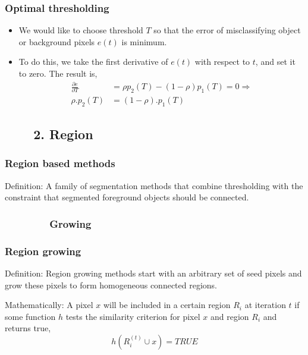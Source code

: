 \begin{frame}
\frametitle{Optimal thresholding}
\logoCSIPCPL\mypagenum
	\begin{itemize}
		\item We would like to choose threshold $T$ so that the error of
		misclassifying object or background pixels $e(t)$ is minimum.
		\item To do this, we take the first derivative of $e(t)$ with respect
		to $t$, and set it to zero.  The result is,
		\begin{align*}
			\frac{\partial{e}}{\partial{T}}&=\rho p_2(T) - (1-\rho) p_1(T) = 0 \Rightarrow \\
			\rho.p_2(T)  &= (1-\rho).p_1(T)
		\end{align*}	
	\end{itemize}
\end{frame}





\subsection{\ \ \ \ 2. Region}

\begin{frame}
\frametitle{Region based methods}
\logoCSIPCPL\mypagenum
	\begin{block}{Definition:}
		A family of segmentation methods that combine thresholding with the constraint that segmented foreground objects should be connected.
	\end{block}
\end{frame}



\subsubsection{\ \ \ \ \ \ \ \ Growing}
\begin{frame}
\frametitle{Region growing}
\logoCSIPCPL\mypagenum
	\begin{block}{Definition:}
		Region growing methods start with an arbitrary set of seed pixels and grow these pixels to form homogeneous connected regions.
	\end{block}
	\begin{block}{Mathematically:}
		A pixel $x$ will be included in a certain region $R_i$ at iteration $t$ if some function $h$ tests the similarity criterion for pixel $x$ and region $R_i$ and returns true,
		\begin{equation}
			h(R_i^{(t)} \cup x) = TRUE \label{eqn:RegionGrowing}
		\end{equation}
	\end{block}
\end{frame}






